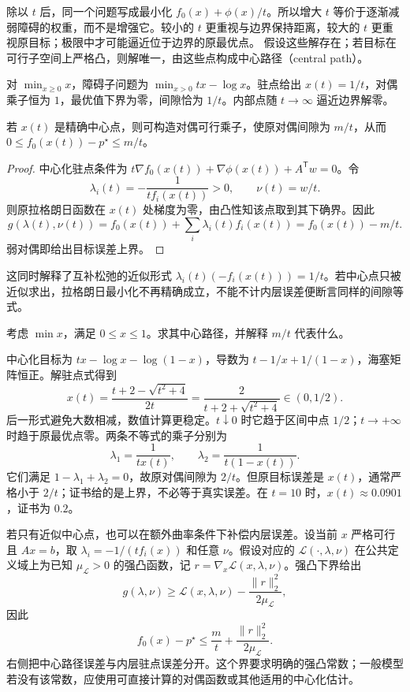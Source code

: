 除以 $t$ 后，同一个问题写成最小化 $f_0(x)+\phi(x)/t$。所以增大 $t$ 等价于逐渐减弱障碍的权重，而不是增强它。较小的 $t$ 更重视与边界保持距离，较大的 $t$ 更重视原目标；极限中才可能逼近位于边界的原最优点。
假设这些解存在；若目标在可行子空间上严格凸，则解唯一，由这些点构成中心路径（central path）。

\begin{example}[一维中心路径]
对 $\min_{x\geq0}x$，障碍子问题为 $\min_{x>0}tx-\log x$。驻点给出 $x(t)=1/t$，对偶乘子恒为 $1$，最优值下界为零，间隙恰为 $1/t$。内部点随 $t\to\infty$ 逼近边界解零。
\end{example}

\begin{theorem}[精确中心点的误差界]
若 $x(t)$ 是精确中心点，则可构造对偶可行乘子，使原对偶间隙为 $m/t$，从而 $0\leq f_0(x(t))-p^\star\leq m/t$。
\end{theorem}
\begin{proof}
中心化驻点条件为 $t\nabla f_0(x(t))+\nabla\phi(x(t))+A^{\mathsf T}w=0$。令
\[
 \lambda_i(t)=-\frac1{t f_i(x(t))}>0,\qquad\nu(t)=w/t.
\]
则原拉格朗日函数在 $x(t)$ 处梯度为零，由凸性知该点取到其下确界。因此
\[
 g(\lambda(t),\nu(t))=f_0(x(t))+\sum_i\lambda_i(t)f_i(x(t))
 =f_0(x(t))-m/t.
\]
弱对偶即给出目标误差上界。
\end{proof}
这同时解释了互补松弛的近似形式 $\lambda_i(t)(-f_i(x(t)))=1/t$。若中心点只被近似求出，拉格朗日最小化不再精确成立，不能不计内层误差便断言同样的间隙等式。

\begin{example}[区间上的中心点与误差证书]
考虑 $\min x$，满足 $0\leq x\leq1$。求其中心路径，并解释 $m/t$ 代表什么。
\end{example}
\begin{solve}
中心化目标为 $tx-\log x-\log(1-x)$，导数为 $t-1/x+1/(1-x)$，海塞矩阵恒正。解驻点式得到
\[
 x(t)=\frac{t+2-\sqrt{t^2+4}}{2t}
     =\frac{2}{t+2+\sqrt{t^2+4}}\in(0,1/2).
\]
后一形式避免大数相减，数值计算更稳定。$t\downarrow0$ 时它趋于区间中点 $1/2$；$t\to+\infty$ 时趋于原最优点零。两条不等式的乘子分别为
\[
 \lambda_1=\frac1{tx(t)},\qquad
 \lambda_2=\frac1{t(1-x(t))}.
\]
它们满足 $1-\lambda_1+\lambda_2=0$，故原对偶间隙为 $2/t$。但原目标误差是 $x(t)$，通常严格小于 $2/t$；证书给的是上界，不必等于真实误差。在 $t=10$ 时，$x(t)\approx0.0901$，证书为 $0.2$。
\end{solve}

若只有近似中心点，也可以在额外曲率条件下补偿内层误差。设当前 $x$ 严格可行且 $Ax=b$，取 $\lambda_i=-1/(tf_i(x))$ 和任意 $\nu$。假设对应的 $\mathcal L(\cdot,\lambda,\nu)$ 在公共定义域上为已知 $\mu_{\mathcal L}>0$ 的强凸函数，记 $r=\nabla_x\mathcal L(x,\lambda,\nu)$。强凸下界给出
\[
 g(\lambda,\nu)\geq
 \mathcal L(x,\lambda,\nu)-\frac{\|r\|_2^2}{2\mu_{\mathcal L}},
\]
因此
\begin{equation}
 f_0(x)-p^\star
 \leq\frac mt+\frac{\|r\|_2^2}{2\mu_{\mathcal L}}.
 \label{eq:co-inexact-center-bound}
\end{equation}
右侧把中心路径误差与内层驻点误差分开。这个界要求明确的强凸常数；一般模型若没有该常数，应使用可直接计算的对偶函数或其他适用的中心化估计。

